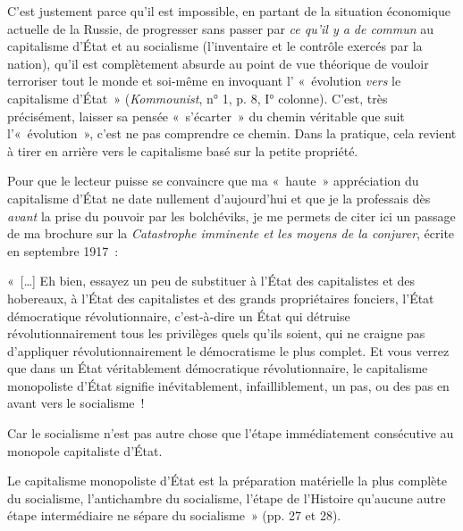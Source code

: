 \documentclass[french,twoside]{book} %
\newenvironment{quoteblock}%
  {\begin{quoting}}
  {\end{quoting}}
\newenvironment{quotebar}{%
    \def\FrameCommand{{\color{rubric!10!}\vrule width 0.5em} \hspace{0.9em}}%
    \def\OuterFrameSep{\itemsep} %
    \MakeFramed {\advance\hsize-\width \FrameRestore}
  }%
  {%
    \endMakeFramed
  }
\renewenvironment{quoteblock}%
  {%
    \savenotes
    \setstretch{0.9}
    \normalfont
    \begin{quotebar}
  }
  {%
    \end{quotebar}
    \spewnotes
  }
\begin{document}
C'est justement parce qu’il est impossible, en partant de la situation économique actuelle de la Russie, de progresser sans passer par \emph{ce qu’il y a de commun} au capitalisme d’État et au socialisme (l’inventaire et le contrôle exercés par la nation), qu’il est complètement absurde au point de vue théorique de vouloir terroriser tout le monde et soi‑même en invoquant l’ « évolution \emph{vers} le capitalisme d’État » (\emph{Kommounist}, n° 1, p. 8, I° colonne). C'est, très précisément, laisser sa pensée « s’écarter » du chemin véritable que suit l’« évolution », c’est ne pas comprendre ce chemin. Dans la pratique, cela revient à tirer en arrière vers le capitalisme basé sur la petite propriété.\par
Pour que le lecteur puisse se convaincre que ma « haute » appréciation du capitalisme d’État ne date nullement d’aujourd’hui et que je la professais dès \emph{avant} la prise du pouvoir par les bolchéviks, je me permets de citer ici un passage de ma brochure sur la \emph{Catastrophe imminente et les moyens de la conjurer}, écrite en septembre 1917 :\par

\begin{quoteblock}
 \noindent « […] Eh bien, essayez un peu de substituer à l’État des capitalistes et des hobereaux, à l’État des capitalistes et des grands propriétaires fonciers, l’État démocratique révolutionnaire, c’est‑à‑dire un État qui détruise révolutionnairement tous les privilèges quels qu’ils soient, qui ne craigne pas d’appliquer révolutionnairement le démocratisme le plus complet. Et vous verrez que dans un État véritablement démocratique révolutionnaire, le capitalisme monopoliste d’État signifie inévitablement, infailliblement, un pas, ou des pas en avant vers le socialisme !\par
 […] Car le socialisme n’est pas autre chose que l’étape immédiatement consécutive au monopole capitaliste d’État.\par
 […] Le capitalisme monopoliste d’État est la préparation matérielle la plus complète du socialisme, l’antichambre du socialisme, l’étape de l’Histoire qu’aucune autre étape intermédiaire ne sépare du socialisme » (pp. 27 et 28).
\end{quoteblock}
\end{document}
